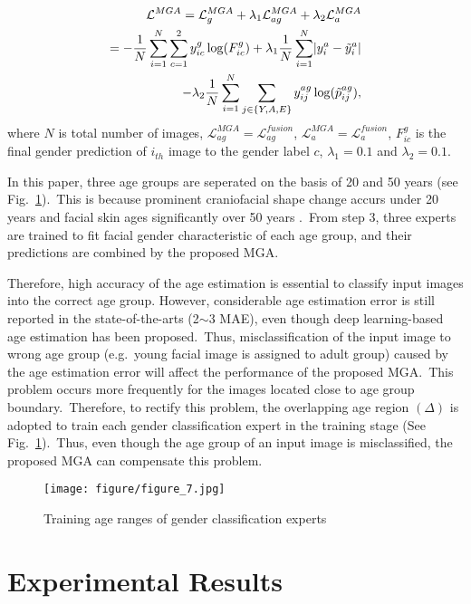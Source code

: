 \documentclass[10pt,twocolumn,letterpaper]{article}
\begin{document}
\begin{align}
\label{loss function of MGA}
    \mathcal{L}^{MGA}=\mathcal{L}_g^{MGA}+\lambda_1\mathcal{L}_{ag}^{MGA}+\lambda_2\mathcal{L}_a^{MGA}\nonumber\\
    =-\frac{1}{N}\sum_{i=1}^N\sum_{c=1}^2y_{ic}^g\log(F_{ic}^g)+\lambda_1\frac{1}{N}\sum_{i=1}^N\lvert y_i^{a}    -\Tilde{y}_i^a\rvert\\-\lambda_2\frac{1}{N}\sum_{i=1}^N\sum_{j\in\{Y,A,E\}}y_{ij}^{ag}\log(\Tilde{p}^{ag}_{ij})\nonumber,
\end{align}
where $N$ is total number of images, $\mathcal{L}_{ag}^{MGA}=\mathcal{L}_{ag}^{fusion}$, $\mathcal{L}_{a}^{MGA}=\mathcal{L}_{a}^{fusion}$, $F_{ic}^{g}$ is the final gender prediction of $i_{th}$ image to the gender label $c$, $\lambda_1=0.1$ and $\lambda_2=0.1$.

In this paper, three age groups are seperated on the basis of 20 and 50 years (see Fig.~\ref{fig:figure_7}).~This is because prominent craniofacial shape change accurs under 20 years and facial skin ages significantly over 50 years \cite{Guo2009}.~From step 3, three experts are trained to fit facial gender characteristic of each age group, and their predictions are combined by the proposed MGA.

Therefore, high accuracy of the age estimation is essential to classify input images into the correct age group. However, considerable age estimation error is still reported in the state-of-the-arts (2$\sim$3 MAE), even though deep learning-based age estimation has been proposed.~Thus, misclassification of the input image to wrong age group (e.g.~young facial image is assigned to adult group) caused by the age estimation error will affect the performance of the proposed MGA.~This problem occurs more frequently for the images located close to age group boundary.~Therefore, to rectify this problem, the overlapping age region $(\Delta)$ is adopted to train each gender classification expert in the training stage (See Fig.~\ref{fig:figure_7}).~Thus, even though the age group of an input image is misclassified, the proposed MGA can compensate this problem.

\begin{figure}[!h]
    \centering
    \texttt{[image: figure/figure\_7.jpg]}
    \caption{Training age ranges of gender classification experts}
    \label{fig:figure_7}
\end{figure}

\section{Experimental Results}
\end{document}
